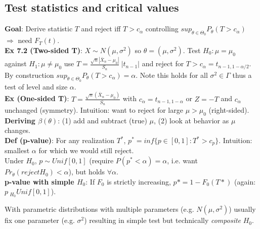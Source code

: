 \subsection{Test statistics and critical values}
\textbf{Goal}: Derive statistic $T$ and reject iff $T>c_\alpha$ controlling $sup_{\theta\in\Theta_0}P_\theta(T>c_\alpha)$ $\Rightarrow$ need $F_T(t)$.\\
\textbf{Ex 7.2 (Two-sided T)}: $X\sim N(\mu, \sigma^2)$ so $\theta = (\mu, \sigma^2)$. Test $H_0:\mu=\mu_0$ against $H_1:\mu\neq\mu_0$ use $T = \frac{\sqrt{n}|\bar{X}_n-\mu_0|}{S_n} ~ |t_{n-1}|$ and reject for $T > c_\alpha = t_{n-1, 1-\alpha/2}$. By construction $sup_{\theta\in\Theta_0}P_\theta(T>c_\alpha)=\alpha$. \footnotesize{Note this holds for all $\sigma^2\in\Gamma$ thus a test of level and size $\alpha$.}\\
\textbf{Ex (One-sided T)}: $T = \frac{\sqrt{n}(\bar{X}_n-\mu_0)}{S_n}$ with $c_\alpha = t_{n-1, 1-\alpha}$ or $Z = -T$ and $c_\alpha$ unchanged (symmetry). Intuition: want to reject for large $\mu > \mu_0$ (right-sided).\\
\textbf{Deriving $\beta(\theta)$}: (1) add and subtract (true) $\mu$, (2) look at behavior as $\mu$ changes. \\
\textbf{Def (p-value)}: For any realization $T^*$, $p^* = inf\{p\in[0,1]: T^*>c_p\}$. Intuition: smallest $\alpha$ for which we would still reject. \\\footnotesize{Under $H_0$, $p\sim Unif[0,1]$ (require $P(p^*<\alpha)=\alpha$, i.e. want $Pr_\theta(reject H_0) < \alpha$), but holds $\forall\alpha$.}\\
\textbf{p-value with simple $H_0$}: If $F_0$ is strictly increasing, $p* = 1 - F_0(T*)$ (again: $p~_{H_0}Unif[0,1]$).

\footnotesize{With parametric distributions with multiple parameters (e.g. $N(\mu, \sigma^2)$) usually fix one parameter (e.g. $\sigma^2$) resulting in simple test but technically \textit{composite} $H_0$.}

